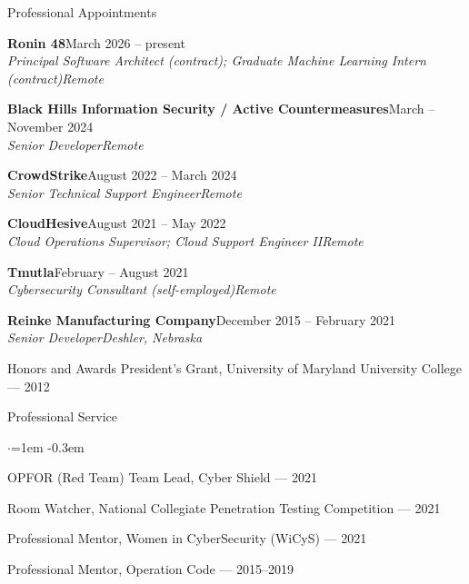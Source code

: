 \documentclass{resume}
\newcommand{\cventry}[4]{%
  {\bf #1}\hfill{#2}\\
  {\em #3}\hfill{\em #4}\par\smallskip
}
\begin{document}
\begin{rSection}{Professional Appointments}

\cventry{Ronin 48}{March 2026 -- present}{Principal Software Architect (contract); Graduate Machine Learning Intern (contract)}{Remote}

\cventry{Black Hills Information Security / Active Countermeasures}{March -- November 2024}{Senior Developer}{Remote}

\cventry{CrowdStrike}{August 2022 -- March 2024}{Senior Technical Support Engineer}{Remote}

\cventry{CloudHesive}{August 2021 -- May 2022}{Cloud Operations Supervisor; Cloud Support Engineer II}{Remote}

\cventry{Tmutla}{February -- August 2021}{Cybersecurity Consultant (self-employed)}{Remote}

\cventry{Reinke Manufacturing Company}{December 2015 -- February 2021}{Senior Developer}{Deshler, Nebraska}

\end{rSection}


\begin{rSection}{Honors and Awards}
President's Grant, University of Maryland University College --- 2012
\end{rSection}


\begin{rSection}{Professional Service}

\begin{list}{$\cdot$}{\leftmargin=1em \itemsep -0.3em}
\item OPFOR (Red Team) Team Lead, Cyber Shield --- 2021
\item Room Watcher, National Collegiate Penetration Testing Competition --- 2021
\item Professional Mentor, Women in CyberSecurity (WiCyS) --- 2021
\item Professional Mentor, Operation Code --- 2015--2019
\end{list}

\end{rSection}
\end{document}
